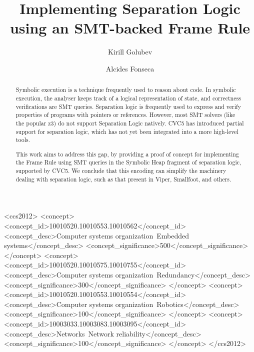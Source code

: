\documentclass[sigplan,screen,review]{acmart}
\begin{document}
\title{Implementing Separation Logic using an SMT-backed Frame Rule}

\author{Kirill Golubev}
\author{Alcides Fonseca}

\begin{abstract}

Symbolic execution is a technique frequently used to reason about code. In symbolic execution, the analyser keeps track of a logical representation of state, and correctness verifications are SMT queries. Separation logic is frequently used to express and verify properties of programs with pointers or references. However, most SMT solvers (like the popular z3) do not support Separation Logic natively. CVC5 has introduced partial support for separation logic, which has not yet been integrated into a more high-level tools.

This work aims to address this gap, by providing a proof of concept for implementing the Frame Rule using SMT queries in the Symbolic Heap fragment of separation logic, supported by CVC5. We conclude that this encoding can simplify the machinery dealing with separation logic, such as that present in Viper, Smallfoot, and others.


\end{abstract}

\begin{CCSXML}
<ccs2012>
 <concept>
  <concept_id>10010520.10010553.10010562</concept_id>
  <concept_desc>Computer systems organization~Embedded systems</concept_desc>
  <concept_significance>500</concept_significance>
 </concept>
 <concept>
  <concept_id>10010520.10010575.10010755</concept_id>
  <concept_desc>Computer systems organization~Redundancy</concept_desc>
  <concept_significance>300</concept_significance>
 </concept>
 <concept>
  <concept_id>10010520.10010553.10010554</concept_id>
  <concept_desc>Computer systems organization~Robotics</concept_desc>
  <concept_significance>100</concept_significance>
 </concept>
 <concept>
  <concept_id>10003033.10003083.10003095</concept_id>
  <concept_desc>Networks~Network reliability</concept_desc>
  <concept_significance>100</concept_significance>
 </concept>
</ccs2012>
\end{CCSXML}
\end{document}
